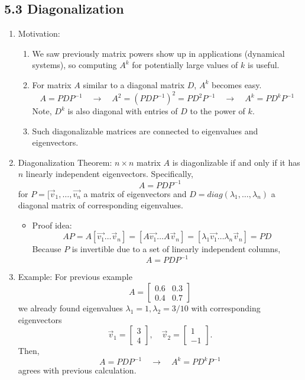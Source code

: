 \documentclass{article}
\begin{document}
\subsection{5.3 Diagonalization}

\begin{enumerate}

\item Motivation:
\begin{enumerate}
\item We saw previously matrix powers show up in applications (dynamical systems), so computing $A^k$ for potentially large values of $k$ is useful.
\item For matrix $A$ similar to a diagonal matrix $D$, $A^k$ becomes easy.
\[
A = PDP^{-1} \quad \rightarrow \quad 
A^2 = (PDP^{-1})^2 = PD^2P^{-1} \quad \rightarrow \quad 
A^k = PD^kP^{-1}
\]
Note, $D^k$ is also diagonal with entries of $D$ to the power of $k$. 
\item Such diagonalizable matrices are connected to eigenvalues and eigenvectors.
\end{enumerate}

\item Diagonalization Theorem: $n \times n$ matrix $A$ is diagonlizable if and only if it has $n$ linearly independent eigenvectors. Specifically,
\[
A = PDP^{-1}
\]
for $P = [\vec{v}_1, \dots, \vec{v_n}$ a matrix of eigenvectors and $D=diag(\lambda_1, \dots, \lambda_n)$ a diagonal matrix of corresponding eigenvalues.
\begin{itemize}
\item Proof idea: 
\[
AP = A[\vec{v_1} \dots \vec{v}_n] = [A\vec{v_1} \dots A\vec{v}_n] = [\lambda_1\vec{v_1} \dots \lambda_n\vec{v}_n]  = PD
\]
Because $P$ is invertible due to a set of linearly independent columns, 
\[
A = PDP^{-1}
\]
\end{itemize}

\item Example: For previous example
\[
A = \left[
\begin{array}{cc}
0.6 & 0.3 \\
0.4 & 0.7
\end{array}
\right]
\]
we already found eigenvalues $\lambda_1 = 1, \lambda_2 = 3/10$ with corresponding eigenvectors
\[
\vec{v}_1 = \left[
\begin{array}{c}
3 \\ 4
\end{array}
\right], \quad
\vec{v}_2 = \left[
\begin{array}{c}
1 \\ -1
\end{array}
\right].
\]
Then,
\[
A = PDP^{-1} \quad \rightarrow \quad A^k = PD^kP^{-1}
\]
agrees with previous calculation.



\end{enumerate}
\end{document}
